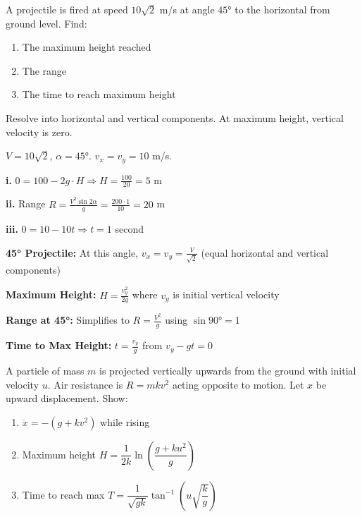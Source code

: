 
\begin{problem}[45° Projectile]
A projectile is fired at speed $10\sqrt{2}$ m/s at angle $45°$ to the horizontal from ground level. Find:
\begin{enumerate}[label=\textbf{\roman*.}]
    \item The maximum height reached
    \item The range
    \item The time to reach maximum height
\end{enumerate}
\end{problem}

\begin{hint}
Resolve into horizontal and vertical components. At maximum height, vertical velocity is zero.
\end{hint}

\begin{solution}
$V = 10\sqrt{2}$, $\alpha = 45°$. $v_x = v_y = 10$ m/s.

\textbf{i.} $0 = 100 - 2g \cdot H \Rightarrow H = \frac{100}{20} = 5$ m

\textbf{ii.} Range $R = \frac{V^2\sin 2\alpha}{g} = \frac{200 \cdot 1}{10} = 20$ m

\textbf{iii.} $0 = 10 - 10t \Rightarrow t = 1$ second
\end{solution}

\begin{takeaways}
\item \textbf{45° Projectile:} At this angle, $v_x = v_y = \frac{V}{\sqrt{2}}$ (equal horizontal and vertical components)
\item \textbf{Maximum Height:} $H = \frac{v_y^2}{2g}$ where $v_y$ is initial vertical velocity
\item \textbf{Range at 45°:} Simplifies to $R = \frac{V^2}{g}$ using $\sin 90° = 1$
\item \textbf{Time to Max Height:} $t = \frac{v_y}{g}$ from $v_y - gt = 0$
\end{takeaways}

\begin{problem}
A particle of mass $m$ is projected vertically upwards from the ground with initial velocity $u$. Air resistance is $R = mkv^2$ acting opposite to motion. Let $x$ be upward displacement. Show:
\begin{enumerate}[label=\textbf{(\roman*)}]
    \item $\ddot{x}=-(g+kv^2)$ while rising
    \item Maximum height $H=\dfrac{1}{2k}\ln\left(\dfrac{g+ku^2}{g}\right)$
    \item Time to reach max $T=\dfrac{1}{\sqrt{gk}}\tan^{-1}\left(u\sqrt{\dfrac{k}{g}}\right)$
\end{enumerate}
\end{problem}

